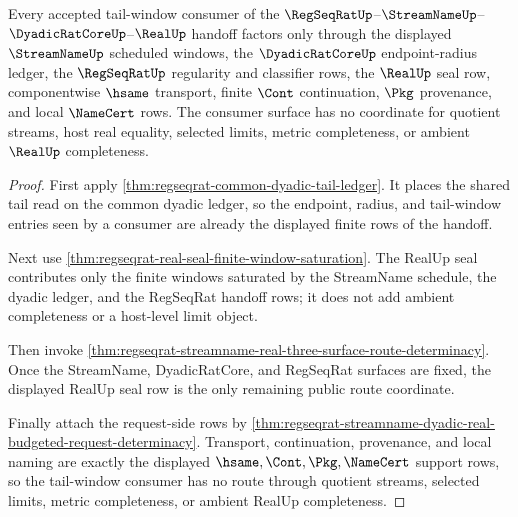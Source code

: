 \begin{theorem}
\label{thm:regseqrat-streamname-real-tail-window-exhaustion}
Every accepted tail-window consumer of the
$\RegSeqRatUp$--$\StreamNameUp$--$\DyadicRatCoreUp$--$\RealUp$ handoff factors
only through the displayed $\StreamNameUp$ scheduled windows, the
$\DyadicRatCoreUp$ endpoint-radius ledger, the $\RegSeqRatUp$ regularity and
classifier rows, the $\RealUp$ seal row, componentwise $\hsame$ transport,
finite $\Cont$ continuation, $\Pkg$ provenance, and local $\NameCert$ rows.
The consumer surface has no coordinate for quotient streams, host real
equality, selected limits, metric completeness, or ambient $\RealUp$
completeness.
\end{theorem}
\begin{proof}
First apply \autoref{thm:regseqrat-common-dyadic-tail-ledger}. It places the
shared tail read on the common dyadic ledger, so the endpoint, radius, and
tail-window entries seen by a consumer are already the displayed finite rows of
the handoff.

Next use \autoref{thm:regseqrat-real-seal-finite-window-saturation}. The RealUp
seal contributes only the finite windows saturated by the StreamName schedule,
the dyadic ledger, and the RegSeqRat handoff rows; it does not add ambient
completeness or a host-level limit object.

Then invoke
\autoref{thm:regseqrat-streamname-real-three-surface-route-determinacy}. Once
the StreamName, DyadicRatCore, and RegSeqRat surfaces are fixed, the displayed
RealUp seal row is the only remaining public route coordinate.

Finally attach the request-side rows by
\autoref{thm:regseqrat-streamname-dyadic-real-budgeted-request-determinacy}.
Transport, continuation, provenance, and local naming are exactly the displayed
$\hsame,\Cont,\Pkg,\NameCert$ support rows, so the tail-window consumer has no
route through quotient streams, selected limits, metric completeness, or
ambient RealUp completeness.
\end{proof}

